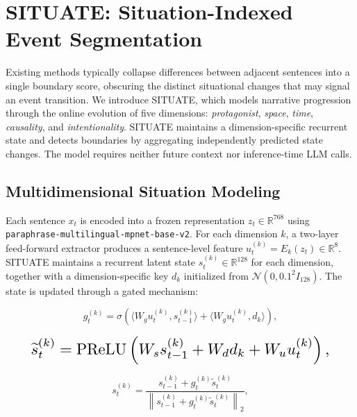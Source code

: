 \documentclass[11pt]{article}
\begin{document}
\section{SITUATE: Situation-Indexed Event Segmentation}
\label{sec:situate}

Existing methods typically collapse differences between adjacent sentences into a single boundary score, obscuring the distinct situational changes that may signal an event transition. We introduce SITUATE, which models narrative progression through the online evolution of five dimensions: \textit{protagonist}, \textit{space}, \textit{time}, \textit{causality}, and \textit{intentionality}. SITUATE maintains a dimension-specific recurrent state and detects boundaries by aggregating independently predicted state changes. The model requires neither future context nor inference-time LLM calls.

\subsection{Multidimensional Situation Modeling}
\label{sec:multidimensional-situation-representation}

Each sentence $x_t$ is encoded into a frozen representation $z_t \in \mathbb{R}^{768}$ using \texttt{paraphrase-multilingual-mpnet-base-v2}. For each dimension $k$, a two-layer feed-forward extractor produces a sentence-level feature $u_t^{(k)}=E_k(z_t) \in \mathbb{R}^{8}$. SITUATE maintains a recurrent latent state $s_t^{(k)} \in \mathbb{R}^{128}$ for each dimension, together with a dimension-specific key $d_k$ initialized from $\mathcal{N}(0,0.1^2I_{128})$. The state is updated through a gated mechanism:

\begin{equation}
g_t^{(k)} = \sigma\left(\langle W_g u_t^{(k)}, s_{t-1}^{(k)}\rangle + \langle W_g u_t^{(k)}, d_k\rangle\right),
\label{eq:gate}
\end{equation}

\begin{equation}
\resizebox{0.89\linewidth}{!}{$
\widetilde{s}_t^{(k)} = \operatorname{PReLU}\left(W_s s_{t-1}^{(k)} + W_d d_k + W_u u_t^{(k)}\right),
$}
\label{eq:candidate}
\end{equation}

\begin{equation}
s_t^{(k)}
=
\frac{
s_{t-1}^{(k)} + g_t^{(k)}\widetilde{s}_t^{(k)}
}{
\left\|
s_{t-1}^{(k)} + g_t^{(k)}\widetilde{s}_t^{(k)}
\right\|_2
},
\label{eq:update}
\end{equation}
\end{document}
